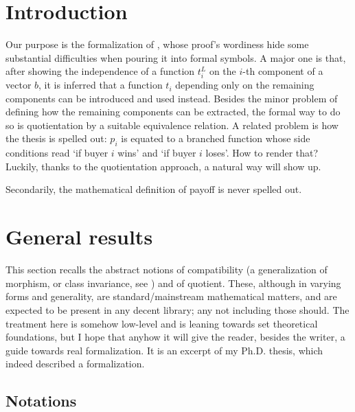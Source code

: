 \documentclass[oneside
]
{article}
\theoremstyle{plain}
\theoremstyle{definition}
\begin{document}
\section{Introduction}

Our purpose is the formalization of \cite[Proposition~2]{mas-04}, whose proof's wordiness hide some substantial difficulties when pouring it into formal symbols.
A major one is that, after showing the independence of a function $t_i^L$ on the $i$-th component of a vector $b$, it is inferred that a function $ t_i $ depending only on the remaining components can be introduced and used instead.
Besides the minor problem of defining how the remaining components can be extracted, the formal way to do so is quotientation by a suitable equivalence relation.
A related problem is how the thesis is spelled out: $p_i$ is equated to a branched function whose side conditions read `if buyer $i$ wins' and `if buyer $i$ loses'.
How to render that? Luckily, thanks to the quotientation approach, a natural way will show up. 

Secondarily, the mathematical definition of payoff is never spelled out.
\section{General results}

This section recalls the abstract notions of compatibility (a generalization of morphism, or class invariance, see \WwwKernel{}) and of quotient. 
These, although in varying forms and generality, are standard/mainstream mathematical matters, and are expected to be present in any decent library; any not including those should.
The treatment here is somehow low-level and is leaning towards set theoretical foundations, but I hope that anyhow it will give the reader, besides the writer, a guide towards real formalization.
It is an excerpt of my Ph.D. thesis, which indeed described a \M{} formalization.

\subsection{Notations}
\end{document}
